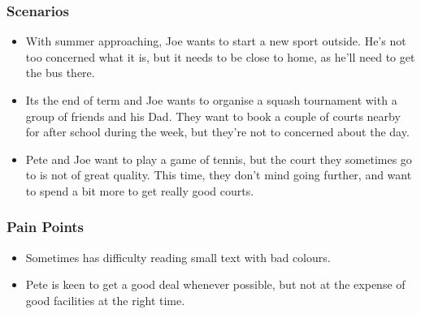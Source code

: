 
\subsubsection*{Scenarios}
\label{ssub:child_scenarios}

\begin{itemize}
	\item With summer approaching, Joe wants to start a new sport outside. He’s
		not too concerned what it is, but it needs to be close to home, as
		he’ll need to get the bus there.

	\item Its the end of term and Joe wants to organise a squash tournament
		with a group of friends and his Dad. They want to book a couple of
		courts nearby for after school during the week, but they’re not to
		concerned about the day.

	\item Pete and Joe want to play a game of tennis, but the court they
		sometimes go to is not of great quality. This time, they don’t mind
		going further, and want to spend a bit more to get really good courts.
\end{itemize}


\subsubsection*{Pain Points}
\label{ssub:child_pain_points}

\begin{itemize}
	\item Sometimes has difficulty reading small text with bad colours.
	\item Pete is keen to get a good deal whenever possible, but not at the
		expense of good facilities at the right time.
\end{itemize}

